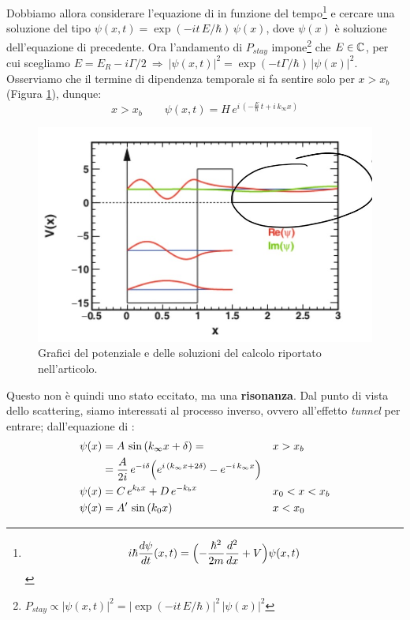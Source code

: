 \noindent Dobbiamo allora considerare l'equazione di \Sch{} in funzione del tempo\footnote{$$i\hbar \frac{d\psi}{dt}(x,t) = \Bigl ( -\frac{\hbar^2}{2m}\frac{d^2}{dx}+V \Bigr )\psi(x,t)$$} e cercare una soluzione del tipo $\psi(x,t) = \exp{(-i t \, E/\hbar)}\,\psi(x)$, dove $\psi(x)$ è soluzione dell'equazione di \Sch{} precedente. Ora l'andamento di $P_{stay}$ impone\footnote{$P_{stay}\propto |\psi(x,t)|^2 = |\exp{(-i t \, E/\hbar)}|^2\,|\psi(x)|^2$} che $E\in \mathbb{C}$, per cui scegliamo $E = E_R - i \Gamma/2 \:\Rightarrow\: |\psi(x,t)|^2 = \exp{(-t\Gamma/\hbar)}\,|\psi(x)|^2$. Osserviamo che il termine di dipendenza temporale si fa sentire solo per $x>x_b$ (Figura \ref{0325_ris2}), dunque:
$$x>x_b \qquad \psi(x,t) = H\,e^{i\,(-\frac{E}{\hbar}\,t + i\,k_\infty x)}$$
\begin{figure}[h]
    \centering
    \includegraphics[scale=0.4]{Immagini/0325_risonanza2.png}
    \caption{Grafici del potenziale e delle soluzioni del calcolo riportato nell'articolo.}
    \label{0325_ris2}
\end{figure}
\noindent Questo non è quindi uno stato eccitato, ma una \textbf{risonanza}. Dal punto di vista dello scattering, siamo interessati al processo inverso, ovvero all'effetto \textit{tunnel} per entrare; dall'equazione di \Sch{}:
\begin{displaymath}
\begin{aligned}
\psi(x)&= A\, \sin{(k_\infty x +\delta)} = & &x>x_b \\
&= \frac{A}{2i} \, e^{-i\delta}\Bigl ( e^{i\,(k_\infty x + 2\delta)} - e^{-i\,k_\infty x} \Bigr ) & \\
\psi(x)&= C\, e^{k_b x} + D\, e^{-k_b x} & &x_0<x<x_b \\
\psi(x)&= A'\, \sin{(k_0 x)} & &x<x_0 
\end{aligned}
\end{displaymath}
